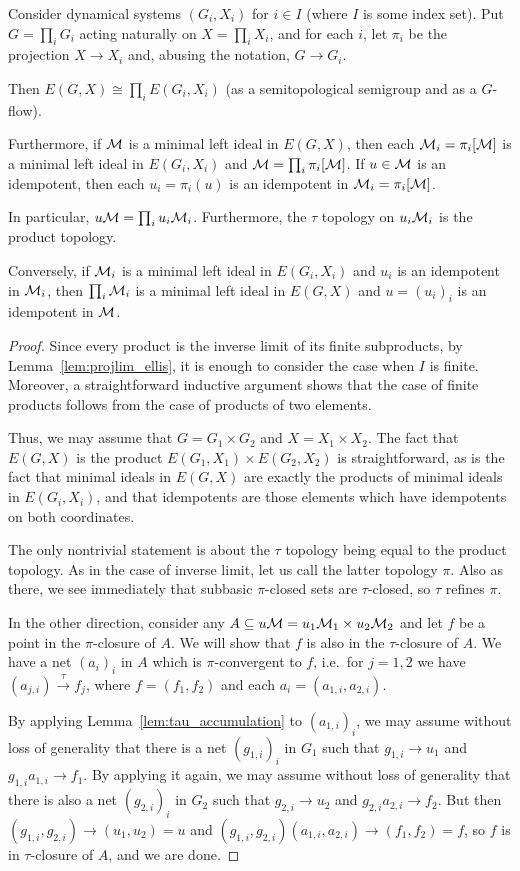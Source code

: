 	
	\begin{lem}
		\label{lem:product_ellis}
		Consider dynamical systems $(G_i,X_i)$ for $i\in I$ (where $I$ is some index set). Put $G=\prod_i G_i$ acting naturally on $X=\prod_i X_i$, and for each $i$, let $\pi_i$ be the projection $X\to X_i$ and, abusing the notation, $G\to G_i$.
		
		Then $E(G,X)\cong \prod_i E(G_i,X_i)$ (as a semitopological semigroup and as a $G$-flow).
		
		Furthermore, if ${\mathcal M}$ is a minimal left ideal in $E(G,X)$, then each ${\mathcal M}_i=\pi_i[{\mathcal M}]$ is a minimal left ideal in $E(G_i,X_i)$ and ${\mathcal M}=\prod_i \pi_i[{\mathcal M}]$. If $u\in {\mathcal M}$ is an idempotent, then each $u_i=\pi_i(u)$ is an idempotent in ${\mathcal M}_i=\pi_i[{\mathcal M}]$.
		
		In particular, $u{\mathcal M}=\prod_i u_i{\mathcal M}_i$. Furthermore, the $\tau$ topology on $u_i{\mathcal M}_i$ is the product topology.
		
		Conversely, if ${\mathcal M}_i$ is a minimal left ideal in $E(G_i,X_i)$ and $u_i$ is an idempotent in ${\mathcal M}_i$, then $\prod_i {\mathcal M}_i$ is a minimal left ideal in $E(G,X)$ and $u=(u_i)_i$ is an idempotent in ${\mathcal M}$.
	\end{lem}
	\begin{proof}
		Since every product is the inverse limit of its finite subproducts, by Lemma~\ref{lem:projlim_ellis}, it is enough to consider the case when $I$ is finite. Moreover, a straightforward inductive argument shows that the case of finite products follows from the case of products of two elements.
		
		Thus, we may assume that $G=G_1\times G_2$ and $X=X_1\times X_2$. The fact that $E(G,X)$ is the product $E(G_1,X_1)\times E(G_2,X_2)$ is straightforward, as is the fact that minimal ideals in $E(G,X)$ are exactly the products of minimal ideals in $E(G_i,X_i)$, and that idempotents are those elements which have idempotents on both coordinates.
		
		The only nontrivial statement is about the $\tau$ topology being equal to the product topology. As in the case of inverse limit, let us call the latter topology $\pi$. Also as there, we see immediately that subbasic $\pi$-closed sets are $\tau$-closed, so $\tau$ refines $\pi$.
		
		In the other direction, consider any $A\subseteq u{\mathcal M}=u_1{\mathcal M}_1\times u_2{\mathcal M}_2$ and let $f$ be a point in the $\pi$-closure of $A$. We will show that $f$ is also in the $\tau$-closure of $A$. We have a net $(a_i)_i$ in $A$ which is $\pi$-convergent to $f$, i.e.\ for $j=1,2$ we have $(a_{j,i})\xrightarrow{\tau} f_j$, where $f=(f_1,f_2)$ and each $a_i=(a_{1,i},a_{2,i})$.
		
		By applying Lemma~\ref{lem:tau_accumulation} to $(a_{1,i})_i$, we may assume without loss of generality that there is a net $(g_{1,i})_i$ in $G_1$ such that $g_{1,i}\to u_1$ and $g_{1,i}a_{1,i}\to f_1$. By applying it again, we may assume without loss of generality that there is also a net $(g_{2,i})_i$ in $G_2$ such that $g_{2,i}\to u_2$ and $g_{2,i}a_{2,i}\to f_2$. But then $(g_{1,i},g_{2,i})\to (u_1,u_2)=u$ and $(g_{1,i},g_{2,i})(a_{1,i},a_{2,i})\to (f_1,f_2)=f$, so $f$ is in $\tau$-closure of $A$, and we are done.
	\end{proof}
	
